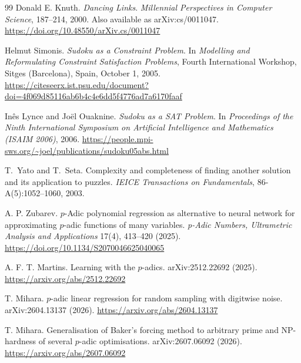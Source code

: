 \documentclass[11pt]{article}
\begin{document}
\begin{thebibliography}{99}
Donald E. Knuth.
\newblock \emph{Dancing Links}.
\newblock \emph{Millennial Perspectives in Computer Science}, 187--214, 2000.
\newblock Also available as arXiv:cs/0011047.
\newblock \url{https://doi.org/10.48550/arXiv.cs/0011047}

Helmut Simonis.
\newblock \emph{Sudoku as a Constraint Problem}.
\newblock In \emph{Modelling and Reformulating Constraint Satisfaction Problems}, Fourth International Workshop, Sitges (Barcelona), Spain, October 1, 2005.
\newblock \url{https://citeseerx.ist.psu.edu/document?doi=4f069d85116ab6b4c4e6dd5f4776ad7a6170faaf}

In\^es Lynce and Jo\"el Ouaknine.
\newblock \emph{Sudoku as a {SAT} Problem}.
\newblock In \emph{Proceedings of the Ninth International Symposium on Artificial Intelligence and Mathematics (ISAIM 2006)}, 2006.
\newblock \url{https://people.mpi-sws.org/~joel/publications/sudoku05abs.html}

T.~Yato and T.~Seta.
\newblock Complexity and completeness of finding another solution and its application to puzzles.
\newblock \emph{IEICE Transactions on Fundamentals}, 86-A(5):1052--1060, 2003.

A. P. Zubarev.
\newblock \(p\)-Adic polynomial regression as alternative to neural network for approximating \(p\)-adic functions of many variables.
\newblock \emph{p-Adic Numbers, Ultrametric Analysis and Applications} 17(4), 413--420 (2025).
\newblock \url{https://doi.org/10.1134/S2070046625040065}

A. F. T. Martins.
\newblock Learning with the \(p\)-adics.
\newblock arXiv:2512.22692 (2025).
\newblock \url{https://arxiv.org/abs/2512.22692}

T. Mihara.
\newblock \(p\)-adic linear regression for random sampling with digitwise noise.
\newblock arXiv:2604.13137 (2026).
\newblock \url{https://arxiv.org/abs/2604.13137}

T. Mihara.
\newblock Generalisation of Baker's forcing method to arbitrary prime and NP-hardness of several \(p\)-adic optimisations.
\newblock arXiv:2607.06092 (2026).
\newblock \url{https://arxiv.org/abs/2607.06092}

\end{thebibliography}
\end{document}
